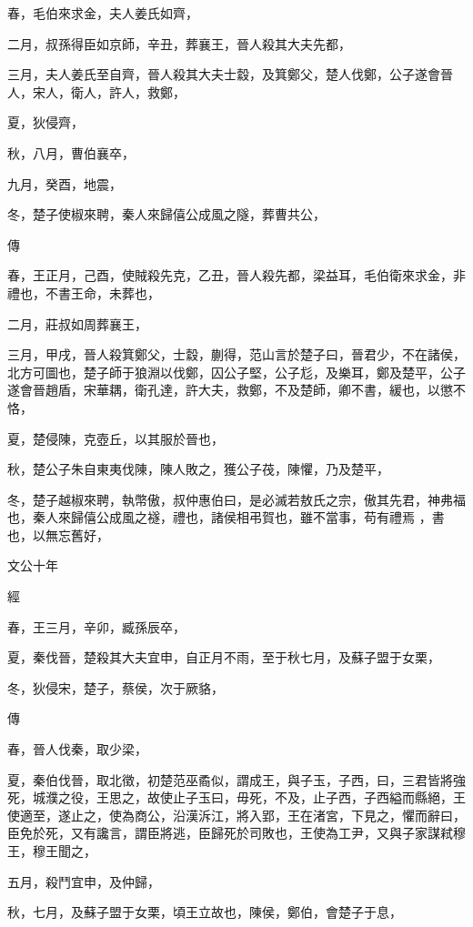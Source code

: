 \documentclass{ctexart}
\begin{document}
春，毛伯來求金，夫人姜氏如齊，

二月，叔孫得臣如京師，辛丑，葬襄王，晉人殺其大夫先都，

三月，夫人姜氏至自齊，晉人殺其大夫士縠，及箕鄭父，楚人伐鄭，公子遂會晉人，宋人，衛人，許人，救鄭，

夏，狄侵齊，

秋，八月，曹伯襄卒，

九月，癸酉，地震，

冬，楚子使椒來聘，秦人來歸僖公成風之隧，葬曹共公，

傳



春，王正月，己酉，使賊殺先克，乙丑，晉人殺先都，梁益耳，毛伯衛來求金，非禮也，不書王命，未葬也，

二月，莊叔如周葬襄王，

三月，甲戌，晉人殺箕鄭父，士縠，蒯得，范山言於楚子曰，晉君少，不在諸侯，北方可圖也，楚子師于狼淵以伐鄭，囚公子堅，公子尨，及樂耳，鄭及楚平，公子遂會晉趙盾，宋華耦，衛孔達，許大夫，救鄭，不及楚師，卿不書，緩也，以懲不恪，

夏，楚侵陳，克壺丘，以其服於晉也，

秋，楚公子朱自東夷伐陳，陳人敗之，獲公子茷，陳懼，乃及楚平，

冬，楚子越椒來聘，執幣傲，叔仲惠伯曰，是必滅若敖氏之宗，傲其先君，神弗福也，秦人來歸僖公成風之襚，禮也，諸侯相弔賀也，雖不當事，苟有禮焉 ，書也，以無忘舊好，





文公十年


經



春，王三月，辛卯，臧孫辰卒，

夏，秦伐晉，楚殺其大夫宜申，自正月不雨，至于秋七月，及蘇子盟于女栗，

冬，狄侵宋，楚子，蔡侯，次于厥貉，

傳



春，晉人伐秦，取少梁，

夏，秦伯伐晉，取北徵，初楚范巫矞似，謂成王，與子玉，子西，曰，三君皆將強死，城濮之役，王思之，故使止子玉曰，毋死，不及，止子西，子西縊而縣絕，王使適至，遂止之，使為商公，沿漢泝江，將入郢，王在渚宮，下見之，懼而辭曰，臣免於死，又有讒言，謂臣將逃，臣歸死於司敗也，王使為工尹，又與子家謀弒穆王，穆王聞之，

五月，殺鬥宜申，及仲歸，

秋，七月，及蘇子盟于女栗，頃王立故也，陳侯，鄭伯，會楚子于息，
\end{document}
